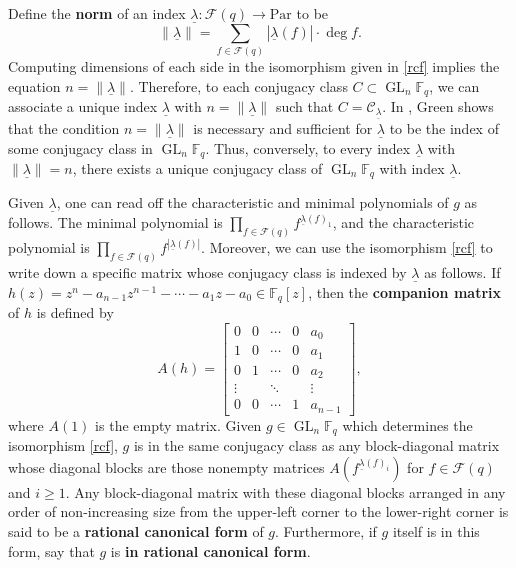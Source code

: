 \documentclass[10pt]{article}
\theoremstyle{definition}
\DeclareMathOperator{\GL}{GL}
\newcommand{\CC}{\mathcal{C}}
\newcommand{\F}{\mathbb{F}}
\newcommand{\CF}{\mathcal{F}}
\newcommand{\myemph}{\textbf}
\newcommand{\Par}{\text{Par}}
\newcommand{\ulambda}{{\underline{\lambda}}}
\begin{document}
Define the \myemph{norm} of an index \(\ulambda : \CF (q) \to \Par\) to be
\begin{equation}
\| \ulambda \| = \sum_{f \in \CF (q)} |\ulambda (f)| \cdot \deg f.
\end{equation}
Computing dimensions of each side in the isomorphism given in \eqref{rcf} implies the equation $n = \| \ulambda \|$.
Therefore, to each conjugacy class $C \subset \GL_n \F_q$, we can associate a unique index $\ulambda$ with $n = \| \ulambda \|$ such that \(C = \CC_\ulambda\).
In \cite{green}, Green shows that the condition $n = \| \ulambda \|$ is necessary and sufficient for $\ulambda$ to be the index of some conjugacy class in $\GL_n \F_q$.
Thus, conversely, to every index $\ulambda$ with $\| \ulambda \| = n$, there exists a unique conjugacy class of $\GL_n \F_q$ with index $\ulambda$.

Given $\ulambda$, one can read off the characteristic and minimal polynomials of $g$ as follows.
The minimal polynomial is
$\prod_{f \in \CF (q)} f^{\ulambda(f)_1}$,
and the characteristic polynomial is
$\prod_{f \in \CF (q)} f^{|\ulambda (f) |}$.
Moreover, we can use the isomorphism \eqref{rcf} to write down a specific matrix whose conjugacy class is indexed by $\ulambda$ as follows.
If $h(z) = z^n - a_{n-1}z^{n-1} - \cdots - a_1 z - a_0 \in \F_q[z]$, then the \myemph{companion matrix} of $h$ is defined by
$$
A(h) = \begin{bmatrix}
0 & 0 & \cdots & 0 & a_0    \\
1 & 0 & \cdots & 0 & a_1    \\
0 & 1 & \cdots & 0 & a_2    \\
\vdots  &   & \ddots &   & \vdots \\
0 & 0 & \cdots & 1 & a_{n-1}
\end{bmatrix},
$$
where $A(1)$ is the empty matrix.
Given $g \in \GL_n \F_q$ which determines the isomorphism \eqref{rcf}, $g$ is in the same conjugacy class as any block-diagonal matrix
whose diagonal blocks are those nonempty matrices $A(f^{\ulambda(f)_i})$ for $f \in \CF (q)$ and $i \geq 1$.
Any block-diagonal matrix with these diagonal blocks arranged in any order of non-increasing size from the upper-left corner to the lower-right corner is said to be a \myemph{rational canonical form} of $g$.
Furthermore, if $g$ itself is in this form, say that $g$ is \myemph{in rational canonical form}.
\end{document}
